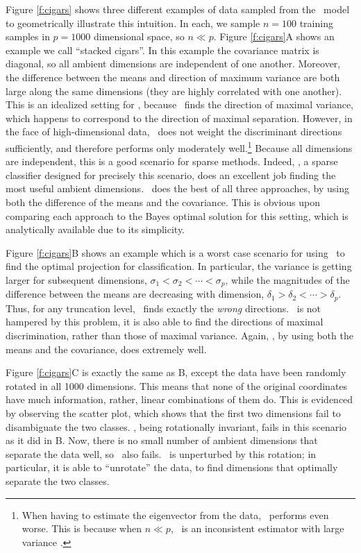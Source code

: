 \documentclass[10pt]{article}
\begin{document}
Figure \ref{f:cigars} shows three different examples of data sampled from the \Lda~model to geometrically illustrate this intuition.
In each, we sample $n=100$ training samples in $p=1000$ dimensional space, so $n \ll p$.
Figure \ref{f:cigars}A shows an example we call  ``stacked cigars''.
In this example the covariance matrix is diagonal, so all ambient dimensions are independent of one another.
Moreover, the difference between the means and direction of maximum variance are both large along the same dimensions (they are highly correlated with one another).
This is an idealized setting for \Pca, because \Pca~finds the direction of maximal variance, which happens to correspond to the direction of maximal separation.
However, in the face of high-dimensional data, \Pca~does not weight the discriminant directions sufficiently, and therefore performs only moderately well.\footnote{When having to estimate the eigenvector from the data, \Pca~performs even worse.  This is because when $n \ll p$, \Pca~is an inconsistent estimator with large variance \cite{Baik2006a,Paul2007a}.}
Because all dimensions are independent, this is a good scenario for sparse methods.
Indeed,  \Road, a sparse classifier designed for precisely this scenario,  does an excellent job finding the most useful ambient dimensions.
\Lol~does the best of all three approaches, by using both the difference of the means and the covariance. This is obvious upon comparing each approach to the Bayes optimal solution for this setting, which is analytically available due to its simplicity.


Figure \ref{f:cigars}B shows an example which is a worst case scenario for using \Pca~to find the optimal projection for classification.
In particular, the variance is getting larger for subsequent dimensions, $\sigma_1 < \sigma_2 < \cdots < \sigma_p$, while the magnitudes of the difference between the means are decreasing with dimension, $\delta_1 > \delta_2 < \cdots > \delta_p$.
Thus, for any truncation level,  \Pca~finds exactly the \emph{wrong} directions.
\Road~is not hampered by this problem, it is also able to find the directions of maximal discrimination, rather than those of maximal variance.
Again, \Lol, by using both the means and the covariance, does extremely well.


Figure \ref{f:cigars}C is exactly the same as B, except the data have been randomly rotated in all 1000 dimensions.  This means that none of the original coordinates have much information, rather, linear combinations of them do.
This is evidenced by observing the scatter plot, which shows that the first two dimensions  fail to disambiguate the two classes.
\Pca, being rotationally invariant, fails in this scenario as it did in B.
Now, there is no small number of ambient dimensions that separate the data well, so \Road~also fails.
 \Lol~is unperturbed by this rotation; in particular, it is able to ``unrotate'' the data, to find dimensions that optimally separate the two classes.
\end{document}
